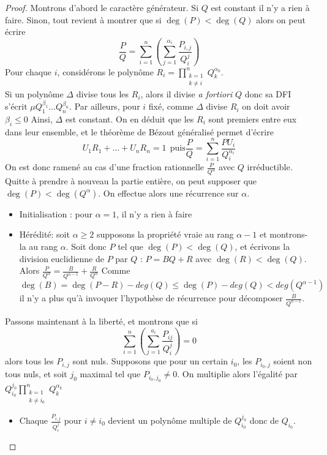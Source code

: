 \documentclass[french]{book}
\theoremstyle{plain}
\theoremstyle{definition}
\theoremstyle{remark}
\begin{document}
\begin{proof}
	Montrons d'abord le caractère générateur. Si $Q$ est constant il n'y a rien à faire. Sinon, tout revient à montrer que si $\deg(P)<\deg(Q)$ alors on peut écrire $$\frac{P}{Q}=\sum_{i=1}^{n}(\sum_{j=1}^{\alpha_{i}}\frac{P_{i,j}}{Q_{i}^{j}})$$ Pour chaque $i$, considérons le polynôme $R_{i}=\displaystyle\prod_{\substack{k=1\\ k\ne i}}^{n}Q_{k}^{\alpha_{k}}$. \\
	Si un polynôme $\Delta$ divise tous les $R_{i}$, alors il divise \textit{a fortiori} $Q$ donc sa DFI s'écrit $\mu Q_{1}^{\beta_{1}}...Q_{n}^{\beta_{n}}$. Par ailleurs, pour $i$ fixé, comme $\Delta$ divise \(R_{i}\) on doit avoir \(\beta_{i}\le0\) Ainsi, $\Delta$ est constant. On en déduit que les $R_{i}$ sont premiers entre eux dans leur ensemble, et le théorème de Bézout généralisé permet d'écrire $$U_{1}R_{1}+\ldots+U_{n}R_{n}=1 \ \ \text{puis} \frac{P}{Q}=\sum_{i=1}^{n}\frac{PU_{i}}{Q_{i}^{\alpha_{i}}}$$ On est donc ramené au cas d'une fraction rationnelle $\frac{P}{Q^{\alpha}}$ avec $Q$ irréductible. Quitte à prendre à nouveau la partie entière, on peut supposer que $\deg(P)<\deg(Q^\alpha)$. On effectue alors une récurrence sur $\alpha$.
	\begin{itemize}
		\item Initialisation : pour $\alpha=1$, il n'y a rien à faire
		\item Hérédité: soit $\alpha\ge2$ supposons la propriété vraie au rang $\alpha-1$ et montrons-la au rang $\alpha$. Soit donc $P$ tel que $\deg(P)<\deg(Q)$, et écrivons la division euclidienne de $P$ par $Q$ : $P=BQ+R$ avec $\deg(R)<\deg(Q)$. Alors
		$\displaystyle\frac{P}{Q^{\alpha}}=\frac{B}{Q^{\alpha-1}}+\frac{R}{Q^{\alpha}}$ Comme $$\deg(B)=\deg(P-R)-deg(Q)\leqslant \deg(P)-deg(Q)<deg(Q^{\alpha-1})$$ il n'y a plus qu'à invoquer l'hypothèse de récurrence pour décomposer $\displaystyle\frac{B}{Q^{\alpha-1}}$.
	\end{itemize}
	Passons maintenant à la liberté, et montrons que si $$\sum_{i=1}^{n}\left(\sum_{j=1}^{a_{i}}\frac{P_{ij}}{Q_{i}^{j}}\right)=0$$ alors tous les $P_{i,j}$ sont nuls. Supposons que pour un certain $i_0$, les $P_{i_0,j}$ soient non tous nuls, et soit $j_{0}$ maximal tel que $P_{i_{0},j_{0}}\ne0$. On multiplie alors l'égalité par $\displaystyle Q_{i_{0}}^{j_{0}}\prod_{\substack{k=1 \\ k\ne i_{0}}}^{n}Q_{k}^{\alpha_{k}}$
	\begin{itemize}
		\item Chaque $\displaystyle\frac{P_{i,j}}{Q_{i}^{j}}$ pour $i\ne i_{0}$ devient un polynôme multiple de $Q_{i_{0}}^{j_{0}}$ donc de $Q_{i_{0}}$.

\end{itemize}
\end{proof}
\end{document}
